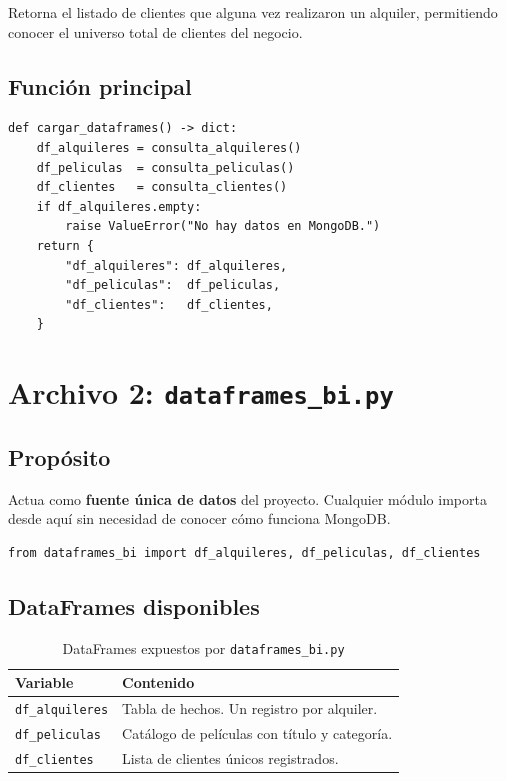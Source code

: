 \documentclass[12pt,a4paper]{article}
\begin{document}
Retorna el listado de clientes que alguna vez realizaron un alquiler,
permitiendo conocer el universo total de clientes del negocio.

\subsection{Funci\'on principal}

\begin{lstlisting}[caption={Funci\'on que ejecuta las tres consultas}]
def cargar_dataframes() -> dict:
    df_alquileres = consulta_alquileres()
    df_peliculas  = consulta_peliculas()
    df_clientes   = consulta_clientes()
    if df_alquileres.empty:
        raise ValueError("No hay datos en MongoDB.")
    return {
        "df_alquileres": df_alquileres,
        "df_peliculas":  df_peliculas,
        "df_clientes":   df_clientes,
    }
\end{lstlisting}

\section{Archivo 2: \texttt{dataframes\_bi.py}}

\subsection{Prop\'osito}

Actua como \textbf{fuente \'unica de datos} del proyecto. Cualquier m\'odulo
importa desde aqu\'i sin necesidad de conocer c\'omo funciona MongoDB.

\begin{lstlisting}[caption={C\'omo importar los DataFrames}]
from dataframes_bi import df_alquileres, df_peliculas, df_clientes
\end{lstlisting}

\subsection{DataFrames disponibles}

\begin{table}[H]
  \centering
  \caption{DataFrames expuestos por \texttt{dataframes\_bi.py}}
  \begin{tabular}{lp{8cm}}
    \toprule
    \textbf{Variable}        & \textbf{Contenido} \\
    \midrule
    \texttt{df\_alquileres}  & Tabla de hechos. Un registro por alquiler. \\
    \texttt{df\_peliculas}   & Cat\'alogo de pel\'iculas con t\'itulo y categor\'ia. \\
    \texttt{df\_clientes}    & Lista de clientes \'unicos registrados. \\
    \bottomrule
  \end{tabular}
\end{table}
\end{document}
